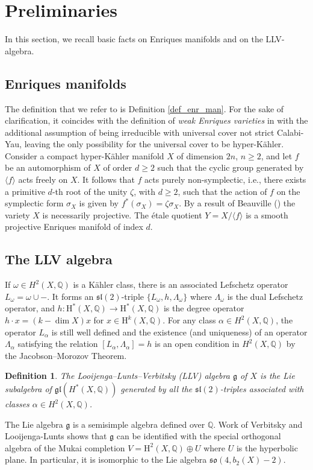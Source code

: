 \documentclass[a4paper,11pt]{amsart}
\newcommand{\bbQ}{{\mathbb Q}}
\newcommand{\mH}{{\mathrm H}}
\newcommand{\kg}{{\mathfrak g}}
\theoremstyle{plain}
\newtheorem{definition}[satz]{Definition}
\theoremstyle{remark}
\begin{document}
\section{Preliminaries}
In this section, we recall basic facts on Enriques manifolds and on the LLV-algebra.
\subsection{Enriques manifolds}
The definition that we refer to is Definition \ref{def_enr_man}. For the sake of clarification, it coincides with the definition of \textit{weak Enriques varieties} in \cite[\S2.2]{BN-WS} with the additional assumption of being irreducible with universal cover not strict Calabi-Yau, leaving the only possibility for the universal cover to be hyper-Kähler. Consider a compact hyper-Kähler manifold \(X\) of dimension \(2n\), \(n \geq 2\), and let \(f\) be an automorphism of \(X\) of order \(d \geq 2 \) such that the cyclic group generated by \(\langle f \rangle \) acts freely on \(X\).
It follows that \(f\) acts purely non-symplectic, i.e., there exists a primitive \(d\)-th root of the unity \(\zeta\), with \(d \geq 2\), such that the action of \(f\) on the symplectic form \(\sigma_{X}\) is given by \(f^*(\sigma_X)=\zeta \sigma_X\).
By a result of Beauville (\cite[Proposition 6]{Beauville:some.remarks}) the variety \(X\) is necessarily projective.
The étale quotient \(Y=X/\langle f \rangle\) is a smooth projective Enriques manifold of index \(d\).

\subsection{The LLV algebra}
If \(\omega\in H^2(X,\bbQ)\) is a Kähler class, there is an associated Lefschetz operator \(L_\omega=\omega\cup-\). It forms an \(\mathfrak{sl}(2)\)-triple \(\{L_\omega,h,\Lambda_\omega\}\) where \(\Lambda_\omega\) is the dual Lefschetz operator, and \(h\colon \mH^*(X,\bbQ) \to \mH^*(X,\bbQ)\) is the degree operator $h\cdot x= (k-\dim X)x$ for \(x\in \mH^k(X, \bbQ)\).
For any class \(\alpha\in H^2(X,\bbQ)\), the operator \(L_\alpha\) is still well defined and the existence (and uniqueness) of an operator \(\Lambda_\alpha\) satisfying the relation \([L_\alpha,\Lambda_\alpha]=h\) is an open condition in \(H^2(X,\bbQ)\) by the Jacobson–Morozov Theorem.

\begin{definition}
    The \textit{Looijenga–Lunts–Verbitsky (LLV) algebra} \(\mathfrak{g}\) of \(X\) is the Lie subalgebra of \(\mathfrak{gl}(H^*(X,\bbQ))\) generated by all the \(\mathfrak{sl}(2)\)-triples associated with classes \(\alpha\in H^2(X,\bbQ)\).
\end{definition}
The Lie algebra \(\mathfrak{g}\) is a semisimple algebra defined over \(\bbQ\).
Work of Verbitsky \cite{Ver90} and Looijenga-Lunts \cite{LL97} shows that $\kg$ can be identified with the special orthogonal algebra of the Mukai completion $V=\mH^2(X,\bbQ)\oplus U$ where $U$ is the hyperbolic plane.  In particular, it is isomorphic to the Lie algebra \(\mathfrak{so}(4,b_2(X)-2)\).
\end{document}
